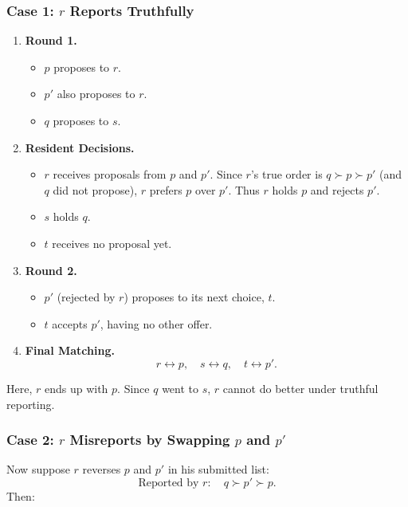 \documentclass[12pt]{article}
\begin{document}
\subsubsection*{Case 1: $r$ Reports Truthfully}
\begin{enumerate}
    \item \textbf{Round 1.} 
    \begin{itemize}
        \item \(p\) proposes to \(r\). 
        \item \(p'\) also proposes to \(r\). 
        \item \(q\) proposes to \(s\).
    \end{itemize}
    \item \textbf{Resident Decisions.}
    \begin{itemize}
        \item \(r\) receives proposals from \(p\) and \(p'\). 
              Since \(r\)'s true order is \(q \succ p \succ p'\) (and \(q\) did not propose), \(r\) prefers \(p\) over \(p'\). 
              Thus \(r\) holds \(p\) and rejects \(p'\).
        \item \(s\) holds \(q\). 
        \item \(t\) receives no proposal yet.
    \end{itemize}
    \item \textbf{Round 2.}
    \begin{itemize}
        \item \(p'\) (rejected by \(r\)) proposes to its next choice, \(t\). 
        \item \(t\) accepts \(p'\), having no other offer.
    \end{itemize}
    \item \textbf{Final Matching.}
    \[
    r \leftrightarrow p, \quad s \leftrightarrow q, \quad t \leftrightarrow p'.
    \]
\end{enumerate}

Here, \(r\) ends up with \(p\). Since \(q\) went to \(s\), \(r\) cannot do better under truthful reporting.

\subsubsection*{Case 2: $r$ Misreports by Swapping $p$ and $p'$}
Now suppose \(r\) reverses \(p\) and \(p'\) in his submitted list:
\[
\text{Reported by }r:\quad q \succ p' \succ p.
\]
Then:
\end{document}
